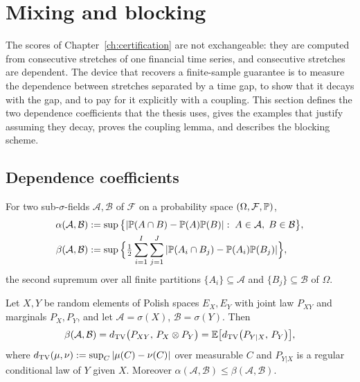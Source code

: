 \documentclass[../../../main.tex]{subfiles}
\begin{document}
\section{Mixing and blocking}\label{sec:prelim-mixing}

The scores of Chapter~\ref{ch:certification} are not exchangeable: they are computed from consecutive stretches of one financial time series, and consecutive stretches are dependent. The device that recovers a finite-sample guarantee is to measure the dependence between stretches separated by a time gap, to show that it decays with the gap, and to pay for it explicitly with a coupling. This section defines the two dependence coefficients that the thesis uses, gives the examples that justify assuming they decay, proves the coupling lemma, and describes the blocking scheme.

\subsection{Dependence coefficients}

\begin{definition}\label{def:prelim-ab-sigma}
For two sub-$\sigma$-fields $\mathcal A,\mathcal B$ of $\mathcal F$ on a probability space $(\Omega,\mathcal F,\mathbb{P})$,
\begin{align*}
\alpha(\mathcal A,\mathcal B)&:=\sup\big\{|\mathbb{P}(A\cap B)-\mathbb{P}(A)\mathbb{P}(B)|:\;A\in\mathcal A,\;B\in\mathcal B\big\},\\
\beta(\mathcal A,\mathcal B)&:=\sup\Big\{\tfrac12\sum_{i=1}^{I}\sum_{j=1}^{J}|\mathbb{P}(A_i\cap B_j)-\mathbb{P}(A_i)\mathbb{P}(B_j)|\Big\},
\end{align*}
the second supremum over all finite partitions $\{A_i\}\subseteq\mathcal A$ and $\{B_j\}\subseteq\mathcal B$ of $\Omega$.
\end{definition}

\begin{lemma}\label{lem:prelim-beta-tv}
Let $X,Y$ be random elements of Polish spaces $E_X,E_Y$ with joint law $P_{XY}$ and marginals $P_X,P_Y$, and let $\mathcal A=\sigma(X)$, $\mathcal B=\sigma(Y)$. Then
\[
\beta(\mathcal A,\mathcal B)=d_{\mathrm{TV}}\big(P_{XY},\,P_X\otimes P_Y\big)=\mathbb{E}\big[d_{\mathrm{TV}}\big(P_{Y|X},\,P_Y\big)\big],
\]
where $d_{\mathrm{TV}}(\mu,\nu):=\sup_C|\mu(C)-\nu(C)|$ over measurable $C$ and $P_{Y|X}$ is a regular conditional law of $Y$ given $X$. Moreover $\alpha(\mathcal A,\mathcal B)\le\beta(\mathcal A,\mathcal B)$.
\end{lemma}
\end{document}
